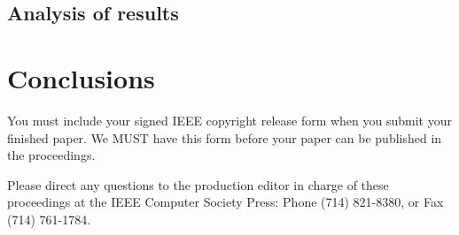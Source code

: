 \documentclass[10pt,twocolumn,letterpaper]{article}
\begin{document}
\subsection{Analysis of results}

\section{Conclusions}

You must include your signed IEEE copyright release form when you submit
your finished paper. We MUST have this form before your paper can be
published in the proceedings.

Please direct any questions to the production editor in charge of these
proceedings at the IEEE Computer Society Press: Phone (714) 821-8380, or
Fax (714) 761-1784.

\printbibliography
\end{document}
